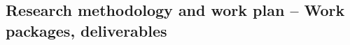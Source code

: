 \documentclass[11pt, a4paper]{article} %
\begin{document}

  
\subsection{Research methodology and work plan – Work packages,
  deliverables}

\begin{itemize}


\end{itemize}
\end{document}
